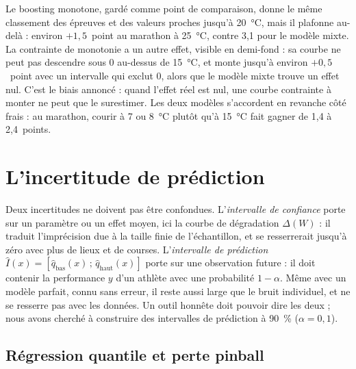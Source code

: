 \documentclass[11pt,a4paper]{article}
\begin{document}
Le boosting monotone, gardé comme point de comparaison, donne le même classement des épreuves et des valeurs proches
jusqu'à 20~°C, mais il plafonne au-delà : environ $+1{,}5$~point au marathon à 25~°C, contre 3,1 pour le modèle mixte.
La contrainte de monotonie a un autre effet, visible en demi-fond : sa courbe ne peut pas descendre sous 0 au-dessus de
15~°C, et monte jusqu'à environ $+0{,}5$~point avec un intervalle qui exclut 0, alors que le modèle mixte trouve un
effet nul. C'est le biais annoncé : quand l'effet réel est nul, une courbe contrainte à monter ne peut que le
surestimer. Les deux modèles s'accordent en revanche côté frais : au marathon, courir à 7 ou 8~°C plutôt qu'à 15~°C
fait gagner de 1,4 à 2,4~points.

\section{L'incertitude de prédiction}\label{sec:incertitude}

Deux incertitudes ne doivent pas être confondues. L'\emph{intervalle de confiance} porte sur un paramètre ou un effet
moyen, ici la courbe de dégradation $\Delta(W)$ : il traduit l'imprécision due à la taille finie de l'échantillon, et
se resserrerait jusqu'à zéro avec plus de lieux et de courses. L'\emph{intervalle de prédiction}
$\hat I(x) = [\hat q_{\text{bas}}(x)\,;\,\hat q_{\text{haut}}(x)]$ porte sur une observation future : il doit contenir
la performance $y$ d'un athlète avec une probabilité $1 - \alpha$. Même avec un modèle parfait, connu sans erreur, il
reste aussi large que le bruit individuel, et ne se resserre pas avec les données. Un outil honnête doit pouvoir dire
les deux ; nous avons cherché à construire des intervalles de prédiction à 90~\% ($\alpha = 0{,}1$).

\subsection{Régression quantile et perte pinball}\label{sec:pinball}
\end{document}
